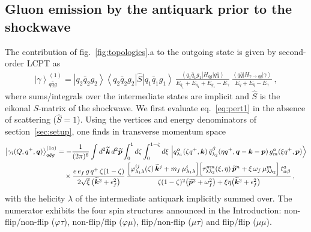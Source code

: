 \documentclass[11pt,a4paper]{article}
\newcommand{\ket}[1]{\left|#1\right\rangle}
\newcommand{\bra}[1]{\left\langle#1\right|}
\newcommand{\vk}{\bm{k}}
\newcommand{\vp}{\bm{p}}
\newcommand{\vq}{\bm{q}}
\newcommand{\kt}{\widetilde{\bm{k}}}
\newcommand{\pt}{\widetilde{\bm{p}}}
\newcommand{\eps}{\epsilon}
\numberwithin{equation}{section}
\begin{document}
\subsection{Gluon emission by the antiquark prior to the shockwave}
\label{sec:beforeSW}

The contribution of fig.~\ref{fig:topologies}.a to the outgoing state is given by
second-order LCPT as
\begin{align}
\label{eq:pert1}
\ket{\gamma}^{(1)}_{q\bar{q}g} = \ket{q_{2}\bar{q}_{2}g_{2}}
\bra{q_{2}\bar{q}_{2}g_{2}}\hat S\ket{q_{1}\bar{q}_{1}g_{1}}\,
\frac{\bra{q_{1}\bar{q}_{1}g_{1}}H_{\bar{q}g}\ket{q\bar{q}}}
{E_{\bar{q}_{1}}+E_{q_{1}}+E_{g_{1}}-E_{\gamma}}\,
\frac{\bra{q\bar{q}}H_{\gamma\rightarrow q\bar{q}}\ket{\gamma}}{E_{q}+E_{\bar{q}}-E_{\gamma}}\,,
\end{align}
where sums/integrals over the intermediate states are implicit and $\hat S$ is the eikonal
$S$-matrix of the shockwave. We first evaluate eq.~\eqref{eq:pert1} in the absence of
scattering ($\hat S=1$). Using the vertices and energy denominators of
section~\ref{sec:setup}, one finds in transverse momentum space
\begin{align}
\label{eq:wf1mom}
\ket{\gamma_{i}(Q,q^{+},\vq)}^{(1a)}_{q\bar{q}g} & = -\frac{1}{(2\pi)^{6}}
\int d^{2}\kt\, d^{2}\pt \int_{0}^{1} d\zeta \int_{0}^{1-\zeta} d\xi\,
\ket{q^{\alpha}_{\lambda_{1}}(\zeta q^{+},\vk)\,\bar{q}^{\beta}_{\lambda_{2}}(\eta q^{+},\vq-\vk-\vp)\,
g^{a}_{m}(\xi q^{+},\vp)} \notag\\
&\quad\times\frac{e\,e_{f}\,g\,q^{+}\,\zeta(1-\zeta)}{2\sqrt{\xi}\,\big(\kt^{2}+\eps^{2}_{f}\big)}\,
\frac{\Big[\varphi^{ij}_{\lambda_{1}\lambda}(\zeta)\,\kt^{j}
+m_{f}\,\mu^{i}_{\lambda_{1}\lambda}\Big]
\Big[\tau^{mn}_{\lambda\lambda_{2}}(\xi,\eta)\,\pt^{n}
+\xi\,\omega_{f}\,\mu^{m}_{\lambda\lambda_{2}}\Big]\,t^{a}_{\alpha\beta}}
{\zeta(1-\zeta)^{2}\big(\pt^{2}+\omega^{2}_{f}\big)+\xi\eta\big(\kt^{2}+\eps_{f}^{2}\big)}\,,
\end{align}
with the helicity $\lambda$ of the intermediate antiquark implicitly summed over. The
numerator exhibits the four spin structures announced in the Introduction: non-flip/non-flip
($\varphi\tau$), non-flip/flip ($\varphi\mu$), flip/non-flip ($\mu\tau$) and flip/flip
($\mu\mu$).
\end{document}
